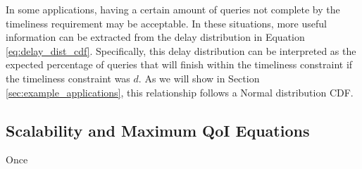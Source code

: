In some applications, having a certain amount of queries not complete by the timeliness requirement may be acceptable.  In these situations, more useful information can be extracted from the delay distribution in Equation \ref{eq:delay_dist_cdf}.  Specifically, this delay distribution can be interpreted as the expected percentage of queries that will finish within the timeliness constraint if the timeliness constraint was $d$.  As we will show in Section \ref{sec:example_applications}, this relationship follows a Normal distribution CDF.

\subsection{Scalability and Maximum QoI Equations}

Once 

%
%

%
